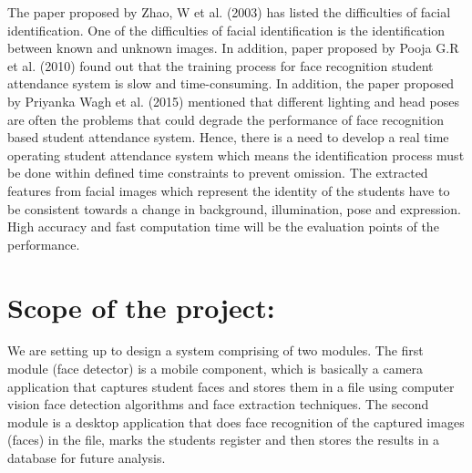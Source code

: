  The paper proposed by Zhao, W et al. (2003) has listed the difficulties of facial identification. One of the difficulties of facial identification is the identification between known and unknown images. In addition, paper proposed by Pooja G.R et al. (2010) found out that the training process for face recognition student attendance system is slow and time-consuming. In addition, the paper proposed by Priyanka Wagh et al. (2015) mentioned that different lighting and head poses are often the problems that could degrade the performance of face recognition based student attendance system. 
 Hence, there is a need to develop a real time operating student attendance system which means the identification process must be done within defined time constraints to prevent omission. The extracted features from facial images which represent the identity of the students have to be consistent towards a change in background, illumination, pose and expression. High accuracy and fast computation time will be the evaluation points of the performance. 
 \newpage
\section{Scope of the project: }
We are setting up to design a system comprising of two modules. The first module (face detector) is a mobile component, which is basically a camera application that captures student faces and stores them in a file using computer vision face detection algorithms and face extraction techniques. The second module is a desktop application that does face recognition of the captured images (faces) in the file, marks the students register and then stores the results in a database for future analysis. 
\newpage
